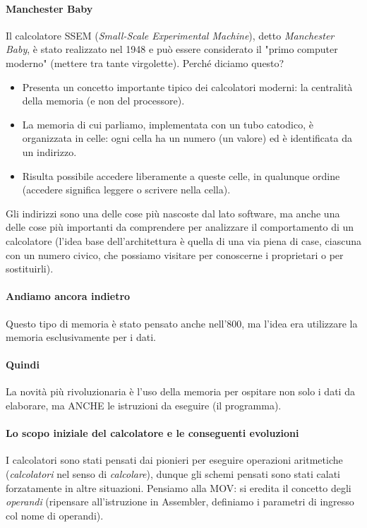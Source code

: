 \documentclass[11pt]{report}
\theoremstyle{definition}
\begin{document}
\paragraph{Manchester Baby} Il calcolatore SSEM (\emph{Small-Scale Experimental Machine}), detto \emph{Manchester Baby}, è stato realizzato nel 1948 e può essere considerato il  "primo computer moderno" (mettere tra tante virgolette). Perché diciamo questo?
\begin{itemize}
\item Presenta un concetto importante tipico dei calcolatori moderni: la centralità della memoria (e non del processore).
\item La memoria di cui parliamo, implementata con un tubo catodico, è organizzata in celle: ogni cella ha un numero (un valore) ed è identificata da un indirizzo.
\item Risulta possibile accedere liberamente a queste celle, in qualunque ordine (accedere significa leggere o scrivere nella cella).
\end{itemize}
Gli indirizzi sono una delle cose più nascoste dal lato software, ma anche una delle cose più importanti da comprendere per analizzare il comportamento di un calcolatore (l'idea base dell'architettura è quella di una via piena di case, ciascuna con un numero civico, che possiamo visitare per conoscerne i proprietari o per sostituirli). 
\paragraph{Andiamo ancora indietro} Questo tipo di memoria è stato pensato anche nell'800, ma l'idea era utilizzare la memoria esclusivamente per i dati.
\paragraph{Quindi} La novità più rivoluzionaria è l'uso della memoria per ospitare non solo i dati da elaborare, ma ANCHE le istruzioni da eseguire  (il programma).
\paragraph{Lo scopo iniziale del calcolatore e le conseguenti evoluzioni} I calcolatori sono stati pensati dai pionieri per eseguire operazioni aritmetiche (\emph{calcolatori} nel senso di \emph{calcolare}), dunque gli schemi pensati sono stati calati forzatamente in altre situazioni. Pensiamo alla MOV: si eredita il concetto degli \emph{operandi} (ripensare all'istruzione in Assembler, definiamo i parametri di ingresso col nome di operandi).
\end{document}
